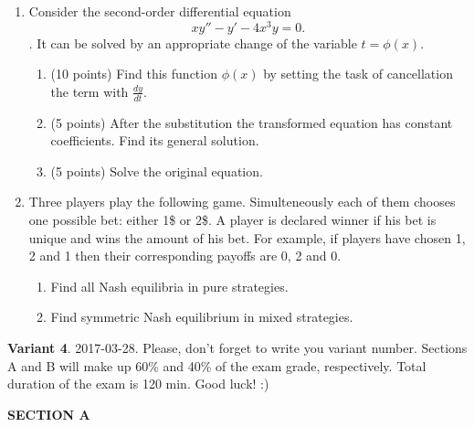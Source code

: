 \documentclass[12pt,a4paper]{article}
\begin{document}
\begin{enumerate}[resume]


\item Consider the second-order differential equation
\[
xy'' - y' - 4{x^3}y = 0.
\].
It can be solved by an appropriate change of the variable $t = \phi (x)$.
\begin{enumerate}
  \item (10 points) Find this function $\phi (x)$ by setting the task of cancellation the term with $\frac{{dy}}{{dt}}$.
  \item (5 points) After the substitution the transformed equation has constant coefficients. Find its general solution.
  \item (5 points) Solve the original equation.
\end{enumerate}

\item Three players play the following game. Simulteneously each of them chooses one possible bet: either 1\$ or 2\$. A player is declared winner if his bet is unique and wins the amount of his bet. For example, if players have chosen 1, 2 and 1 then their corresponding payoffs are 0, 2 and 0.

\begin{enumerate}
  \item Find all Nash equilibria in pure strategies.
  \item Find symmetric Nash equilibrium in mixed strategies.
\end{enumerate}

\end{enumerate}

\newpage
\thispagestyle{empty}
\textbf{Variant 4}. 2017-03-28. Please, don't forget to write you variant number. Sections A and B will make up 60\% and 40\% of the exam grade, respectively. Total duration of the exam is 120 min. Good luck! :)


\textbf{SECTION A}
\end{document}
